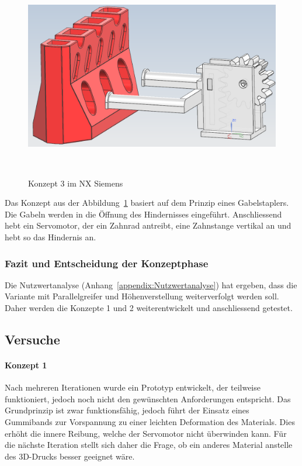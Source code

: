 \documentclass[main.tex]{subfiles} %
\begin{document}
\begin{figure}[H]
    \centering
    \includegraphics[width=1\textwidth]{Konzept_3_Gabelstapler.png}
    \caption{Konzept 3 im NX Siemens}~\label{fig:Konzept_3}
\end{figure}

Das Konzept aus der Abbildung~\ref{fig:Konzept_3} basiert auf dem Prinzip eines Gabelstaplers. Die Gabeln werden in die Öffnung des Hindernisses eingeführt. 
Anschliessend hebt ein Servomotor, der ein Zahnrad antreibt, eine Zahnstange vertikal an und hebt so das Hindernis an.


\newpage

\subsubsection*{Fazit und Entscheidung der Konzeptphase}

Die Nutzwertanalyse (Anhang~\ref{appendix:Nutzwertanalyse}) hat ergeben, dass die Variante mit Parallelgreifer und Höhenverstellung weiterverfolgt werden soll. 
Daher werden die Konzepte 1 und 2 weiterentwickelt und anschliessend getestet.

\subsection*{Versuche}

\paragraph{Konzept 1}

Nach mehreren Iterationen wurde ein Prototyp entwickelt, der teilweise funktioniert, jedoch noch nicht den gewünschten 
Anforderungen entspricht. Das Grundprinzip ist zwar funktionsfähig, jedoch führt der Einsatz eines Gummibands zur Vorspannung 
zu einer leichten Deformation des Materials. Dies erhöht die innere Reibung, welche der Servomotor nicht überwinden kann. 
Für die nächste Iteration stellt sich daher die Frage, ob ein anderes Material anstelle des 3D-Drucks besser geeignet wäre.
\end{document}
